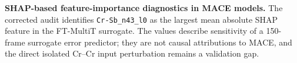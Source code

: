 \textbf{SHAP-based feature-importance diagnostics in MACE models.} The corrected audit identifies \texttt{Cr-Sb\_n43\_l0} as the largest mean absolute SHAP feature in the FT-MultiT surrogate. The values describe sensitivity of a 150-frame surrogate error predictor; they are not causal attributions to MACE, and the direct isolated Cr--Cr input perturbation remains a validation gap.
